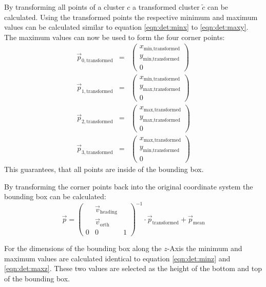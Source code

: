 By transforming all points of a cluster $c$ a transformed cluster $\tilde{c}$ can be calculated.
Using the transformed points the respective minimum and maximum values can be calculated similar to equation \ref{eqn:det:minx} to \ref{eqn:det:maxy}.
The maximum values can now be used to form the four corner points:
\begin{eqnarray}
    \vec{p}_{0,\text{transformed}} &=& 
        \begin{pmatrix}
            x_\text{min,transformed} \\ y_\text{min,transformed} \\ 0
        \end{pmatrix} \\
    \vec{p}_{1,\text{transformed}} &=& 
        \begin{pmatrix}
            x_\text{min,transformed} \\ y_\text{max,transformed} \\ 0
        \end{pmatrix} \\
    \vec{p}_{2,\text{transformed}} &=& 
        \begin{pmatrix}
            x_\text{max,transformed} \\ y_\text{max,transformed} \\ 0
        \end{pmatrix} \\
    \vec{p}_{3,\text{transformed}} &=& 
        \begin{pmatrix}
            x_\text{max,transformed} \\ y_\text{min,transformed} \\ 0
        \end{pmatrix}
\end{eqnarray}
This guarantees, that all points are inside of the bounding box.

By transforming the corner points back into the original coordinate system the bounding box can be calculated:
\begin{equation}
    \vec{p} = {
        \begin{pmatrix}
            & \vec{v}_\text{heading} & \\ & \vec{v}_\text{orth} & \\ 0 & 0 & 1
        \end{pmatrix}
    }^{-1} \cdot \vec{p}_\text{transformed} + \vec{p}_\text{mean}
\end{equation}

For the dimensions of the bounding box along the $z$-Axis the minimum and maximum values are calculated identical to equation \ref{eqn:det:minz} and \ref{eqn:det:maxz}. These two values are selected as the height of the bottom and top of the bounding box.

